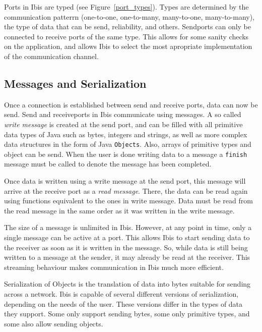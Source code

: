 \documentclass[10pt]{article}
\begin{document}
Ports in Ibis are typed (see Figure~\ref{port_types}). Types are
determined by the communication patterrn (one-to-one, one-to-many,
many-to-one, many-to-many), the type of data that can be send,
reliability, and others. Sendports can only be connected to receive
ports of the same type. This allows for some sanity checks on the
application, and allows Ibis to select the most apropriate
implementation of the communication channel.

\subsection{Messages and Serialization}


Once a connection is established between send and receive ports, data
can now be send. Send and receiveports in Ibis communicate using
messages. A so called \emph{write message} is created at the send port,
and can be filled with all primitive data types of Java such as bytes, integers
and strings, as well as more complex data structures in the form of
Java \texttt{Objects}. Also, arrays of primitive types and object can be
send. When the user is done writing data to a message a \texttt{finish}
message must be called to denote the message has been completed.

Once data is written using a write message at the send port, this
message will arrive at the receive port as a \emph{read message}. There,
the data can be read again using functions equivalent to the ones in
write message. Data must be read from the read message in the same order
as it was written in the write message.

The size of a message is unlimited in Ibis. However, at any point in
time, only a single message can be active at a port. This allows Ibis to
start sending data to the receiver as soon as it is written in the
message. So, while data is still being written to a message at the
sender, it may already be read at the receiver. This streaming behaviour
makes communication in Ibis much more efficient.

Serialization of Objects is the translation of data into bytes suitable for
sending across a network. Ibis is capable of several different versions
of serialization, depending on the needs of the user. These versions
differ in the types of data they support. Some only support sending
bytes, some only primitive types, and some also allow sending objects.
\end{document}
